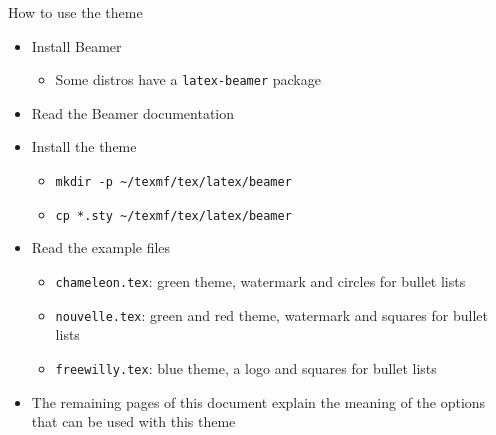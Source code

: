 \begin{frame}[t,fragile]{How to use the theme}
\begin{itemize}
\item Install Beamer
  \begin{itemize}
  \item Some distros have a \verb!latex-beamer! package
  \end{itemize}
\item Read the Beamer documentation
\item Install the theme
  \begin{itemize}
  \item \verb!mkdir -p ~/texmf/tex/latex/beamer!\\
  \item \verb!cp *.sty ~/texmf/tex/latex/beamer!
  \end{itemize}
\item Read the example files
  \begin{itemize}
  \item \verb!chameleon.tex!: green theme, watermark and circles for bullet
        lists
  \item \verb!nouvelle.tex!: green and red theme, watermark and squares for
        bullet lists
  \item \verb!freewilly.tex!: blue theme, a logo and squares for bullet lists
  \end{itemize}
\item The remaining pages of this document explain the meaning of the
      options that can be used with this theme
\end{itemize}
\end{frame}

